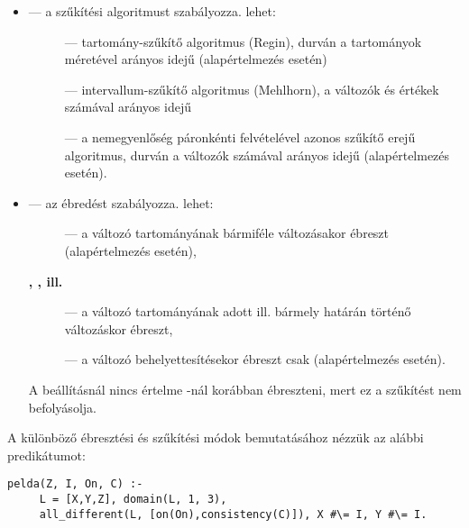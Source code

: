 \begin{itemize}
\item {} --- a szűkítési algoritmust szabályozza.  lehet:
\begin{description}
\item[] --- tartomány-szűkítő algoritmus (Regin), durván a
tartományok méretével arányos idejű (alapértelmezés  esetén)
\item[] --- intervallum-szűkítő algoritmus (Mehlhorn), a
változók és értékek számával arányos idejű
\item[] --- a nemegyenlőség páronkénti felvételével azonos
szűkítő erejű algoritmus, durván a változók számával arányos idejű
(alapértelmezés  esetén).
\end{description}

\item {} --- az ébredést szabályozza.  lehet:
\begin{description}
\item[] --- a változó tartományának bármiféle változásakor
ébreszt (alapértelmezés  esetén),
\item[{\rm \bf {}, , {\rm ill.} }] ---
a változó tartományának adott ill. bármely határán történő változáskor ébreszt,
\item[] --- a változó behelyettesítésekor ébreszt csak (alapértelmezés
 esetén).
\end{description}

A  beállításnál nincs értelme -nál
korábban ébreszteni, mert ez a szűkítést nem befolyásolja.
\end{itemize}

A különböző ébresztési és szűkítési módok bemutatásához nézzük az alábbi predikátumot:

\begin{verbatim}
pelda(Z, I, On, C) :-
     L = [X,Y,Z], domain(L, 1, 3),
     all_different(L, [on(On),consistency(C)]), X #\= I, Y #\= I.
\end{verbatim}

